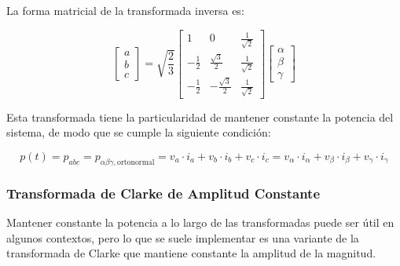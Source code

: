 La forma matricial de la transformada inversa es:

\begin{equation}
    \begin{bmatrix}
        a \\
        b \\
        c
    \end{bmatrix}
    =
    \sqrt{\frac{2}{3}}
    \begin{bmatrix}
        1 & 0 & \frac{1}{\sqrt{2}} \\
        -\frac{1}{2} & \frac{\sqrt{3}}{2} & \frac{1}{\sqrt{2}} \\
        -\frac{1}{2} & -\frac{\sqrt{3}}{2} & \frac{1}{\sqrt{2}}
    \end{bmatrix}
    \begin{bmatrix}
        \alpha \\
        \beta \\
        \gamma
    \end{bmatrix}
\end{equation}

Esta transformada tiene la particularidad de mantener constante la potencia del sistema, de modo que se cumple la siguiente condición:

\begin{equation}
p(t) = p_{abc} = p_{\alpha\beta\gamma, \text{ortonormal}} = v_a \cdot i_a + v_b \cdot i_b + v_c \cdot i_c = v_\alpha \cdot i_\alpha + v_\beta \cdot i_\beta + v_\gamma \cdot i_\gamma
\end{equation}

\subsubsection{Transformada de Clarke de Amplitud Constante}

Mantener constante la potencia a lo largo de las transformadas puede ser útil en algunos contextos, pero lo que se suele implementar es una variante de la transformada de Clarke que mantiene constante la amplitud de la magnitud.

